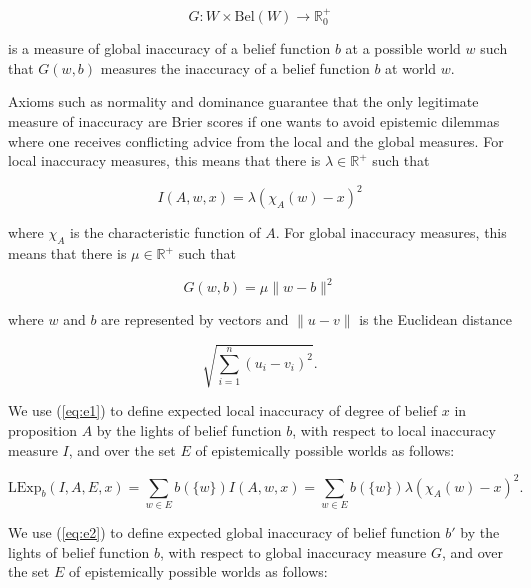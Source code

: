 \documentclass[11pt]{article}
\begin{document}
\begin{equation}
  \label{eq:ginacc}
  G:W\times\mbox{Bel}(W)\rightarrow\mathbb{R}^{+}_{0}
\end{equation}

{\noindent}is a measure of global inaccuracy of a belief function $b$
at a possible world $w$ such that $G(w,b)$ measures the inaccuracy of
a belief function $b$ at world $w$.

Axioms such as normality and dominance guarantee that the only
legitimate measure of inaccuracy are Brier scores if one wants to
avoid epistemic dilemmas where one receives conflicting advice from
the local and the global measures. For local inaccuracy measures, this
means that there is $\lambda\in\mathbb{R}^{+}$ such that

\begin{equation}
  \label{eq:e1}
  I(A,w,x)=\lambda\left(\chi_{A}(w)-x\right)^{2}
\end{equation}

where $\chi_{A}$ is the characteristic function of $A$. For global
inaccuracy measures, this means that there is $\mu\in\mathbb{R}^{+}$
such that

\begin{equation}
  \label{eq:e2}
  G(w,b)=\mu\|w-b\|^{2}
\end{equation}

where $w$ and $b$ are represented by vectors and $\|u-v\|$ is the
Euclidean distance

\begin{equation}
  \label{eq:e3}
  \sqrt{\sum_{i=1}^{n}\left(u_{i}-v_{i}\right)^{2}}.
\end{equation}

We use (\ref{eq:e1}) to define expected local inaccuracy of degree of
belief $x$ in proposition $A$ by the lights of belief function $b$,
with respect to local inaccuracy measure $I$, and over the set $E$ of
epistemically possible worlds as follows:

\begin{equation}
  \label{eq:eli}
  \mbox{LExp}_{b}(I,A,E,x)=\sum_{w\in{}E}b(\{w\})I(A,w,x)=\sum_{w\in{}E}b(\{w\})\lambda\left(\chi_{A}(w)-x\right)^{2}.
\end{equation}

We use (\ref{eq:e2}) to define expected global inaccuracy of belief
function $b'$ by the lights of belief function $b$, with respect to
global inaccuracy measure $G$, and over the set $E$ of epistemically
possible worlds as follows:
\end{document}
